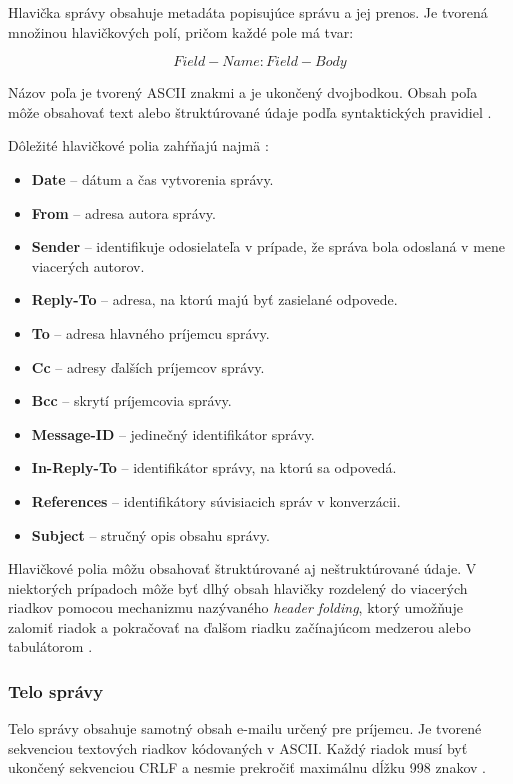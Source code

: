\documentclass[conference]{IEEEtran}
\begin{document}
Hlavička správy obsahuje metadáta popisujúce správu a jej prenos. 
Je tvorená množinou hlavičkových polí, pričom každé pole má tvar:

\[
Field-Name: Field-Body
\]

Názov poľa je tvorený ASCII znakmi a je ukončený dvojbodkou. 
Obsah poľa môže obsahovať text alebo štruktúrované údaje podľa 
syntaktických pravidiel \cite{rfc5322}.

Dôležité hlavičkové polia zahŕňajú najmä \cite{rfc5322}:

\begin{itemize}
\item \textbf{Date} – dátum a čas vytvorenia správy.
\item \textbf{From} – adresa autora správy.
\item \textbf{Sender} – identifikuje odosielateľa v prípade, že správa 
bola odoslaná v mene viacerých autorov.
\item \textbf{Reply-To} – adresa, na ktorú majú byť zasielané odpovede.
\item \textbf{To} – adresa hlavného príjemcu správy.
\item \textbf{Cc} – adresy ďalších príjemcov správy.
\item \textbf{Bcc} – skrytí príjemcovia správy.
\item \textbf{Message-ID} – jedinečný identifikátor správy.
\item \textbf{In-Reply-To} – identifikátor správy, na ktorú sa odpovedá.
\item \textbf{References} – identifikátory súvisiacich správ v konverzácii.
\item \textbf{Subject} – stručný opis obsahu správy.
\end{itemize}

Hlavičkové polia môžu obsahovať štruktúrované aj neštruktúrované údaje. 
V niektorých prípadoch môže byť dlhý obsah hlavičky rozdelený do viacerých 
riadkov pomocou mechanizmu nazývaného \textit{header folding}, ktorý umožňuje 
zalomiť riadok a pokračovať na ďalšom riadku začínajúcom medzerou alebo 
tabulátorom \cite{rfc5322}.

\subsubsection{Telo správy}

Telo správy obsahuje samotný obsah e-mailu určený pre príjemcu. 
Je tvorené sekvenciou 
textových riadkov kódovaných v ASCII. Každý riadok musí byť ukončený 
sekvenciou CRLF a nesmie prekročiť maximálnu dĺžku 998 znakov \cite{rfc5322}.
\end{document}
